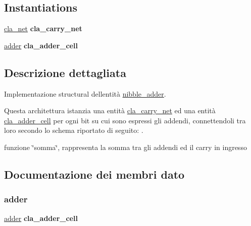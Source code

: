 \subsection*{Instantiations}
 \begin{DoxyCompactItemize}
\item 
\hyperlink{classnibble__adder_1_1structural_abbf8fdf15c2d70392ab929c8ebe57439}{cla\+\_\+net}  {\bfseries cla\+\_\+carry\+\_\+net}   
\item 
\hyperlink{classnibble__adder_1_1structural_a9d7a8a381439c61aea549e7a47ec7a6f}{adder}  {\bfseries cla\+\_\+adder\+\_\+cell}   
\end{DoxyCompactItemize}


\subsection{Descrizione dettagliata}
Implementazione structural dell\textquotesingle{}entità \hyperlink{classnibble__adder}{nibble\+\_\+adder}.

Questa architettura istanzia una entità \hyperlink{classcla__carry__net}{cla\+\_\+carry\+\_\+net} ed una entità \hyperlink{classcla__adder__cell}{cla\+\_\+adder\+\_\+cell} per ogni bit su cui sono espressi gli addendi, connettendoli tra loro secondo lo schema riportato di seguito\+: . 

funzione \char`\"{}somma\char`\"{}, rappresenta la somma tra gli addendi ed il carry in ingresso 

\subsection{Documentazione dei membri dato}
\mbox{\label{classnibble__adder_1_1structural_a9d7a8a381439c61aea549e7a47ec7a6f}} 
\subsubsection{\texorpdfstring{adder}{adder}}
{\footnotesize\ttfamily \hyperlink{classnibble__adder_1_1structural_a9d7a8a381439c61aea549e7a47ec7a6f}{adder} {\bfseries \textcolor{vhdlchar}{cla\+\_\+adder\+\_\+cell}\textcolor{vhdlchar}{ }} \hspace{0.3cm}{\ttfamily [Instantiation]}}

\mbox{\label{classnibble__adder_1_1structural_abbf8fdf15c2d70392ab929c8ebe57439}} 
